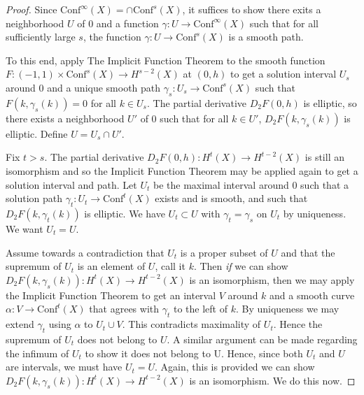 \documentclass{amsart}
\begin{document}
\begin{proof}
Since $\mathrm{Conf}^\infty(X) = \cap \mathrm{Conf}^s(X)$, it suffices to show there exits a neighborhood $U$ of 0 and a function $\gamma: U \to \mathrm{Conf}^\infty(X)$ such that for all sufficiently large $s$, the function $\gamma: U \to \mathrm{Conf}^s(X)$ is a smooth path.

To this end, apply The Implicit Function Theorem to the smooth function $F: (-1,1) \times \mathrm{Conf}^s(X) \to H^{s-2}(X)$ at $(0,h)$ to get a solution interval $U_s$ around $0$ and a unique smooth path $\gamma_s: U_s \to \mathrm{Conf}^s(X)$ such that $F(k, \gamma_s(k))=0$ for all $k \in U_s$. 
The partial derivative $D_2F(0,h)$ is elliptic, so there exists a neighborhood $U'$ of 0 such that for all $k \in U'$, $D_2F(k,\gamma_s(k))$ is elliptic. 
Define $U = U_s \cap U'$.

Fix $t > s$. 
The partial derivative $D_2F(0,h): H^t(X) \to H^{t-2}(X)$ is still an isomorphism and so the Implicit Function Theorem may be applied again to get a solution interval and path. 
Let $U_t$ be the maximal interval around $0$ such that a solution path $\gamma_t: U_t \to \mathrm{Conf}^t(X)$ exists and is smooth, and such that $D_2F(k,\gamma_t(k))$ is elliptic. 
We have $U_t \subset U$ with $\gamma_t = \gamma_s$ on $U_t$ by uniqueness. 
We want $U_t = U$. 

Assume towards a contradiction that $U_t$ is a proper subset of $U$ and that the supremum of $U_t$ is an element of $U$, call it $k$. 
Then \textit{if} we can show $D_2F(k,\gamma_s(k)) : H^t(X) \to H^{t-2}(X)$ is an isomorphism, then we may apply the Implicit Function Theorem to get an interval $V$ around $k$ and a smooth curve $\alpha: V \to \mathrm{Conf}^t(X)$ that agrees with $\gamma_t$ to the left of $k$. 
By uniqueness we may extend $\gamma_t$ using $\alpha$ to $U_t \cup V$. 
This contradicts maximality of $U_t$. 
Hence the supremum of $U_t$ does not belong to $U$. 
A similar argument can be made regarding the infimum of $U_t$ to show it does not belong to U. 
Hence, since both $U_t$ and $U$ are intervals, we must have $U_t = U$.
Again, this is provided we can show $D_2F(k,\gamma_s(k)) : H^t(X) \to H^{t-2}(X)$ is an isomorphism.
We do this now. 


\end{proof}
\end{document}
